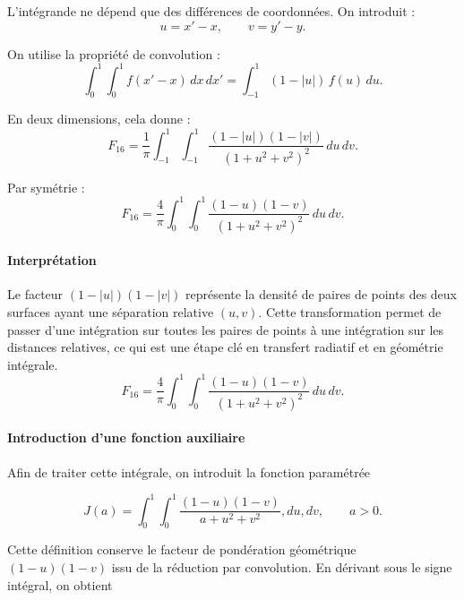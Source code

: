 L'intégrande ne dépend que des différences de coordonnées. On introduit :
\begin{equation}
u=x'-x, \qquad v=y'-y.
\end{equation}

On utilise la propriété de convolution :
\begin{equation}
\int_0^1\int_0^1 f(x'-x)\,dx\,dx'=\int_{-1}^{1}(1-|u|)\,f(u)\,du.
\end{equation}

En deux dimensions, cela donne :
\begin{equation}
F_{16}=\frac{1}{\pi}\int_{-1}^{1}\int_{-1}^{1}\frac{(1-|u|)(1-|v|)}{(1+u^2+v^2)^2}\,du\,dv.
\end{equation}

Par symétrie :
\begin{equation}
F_{16}=\frac{4}{\pi}\int_0^1\int_0^1\frac{(1-u)(1-v)}{(1+u^2+v^2)^2}\,du\,dv.
\end{equation}

\paragraph{Interprétation}

Le facteur $(1-|u|)(1-|v|)$ représente la densité de paires de points des deux surfaces ayant une séparation relative $(u,v)$. Cette transformation permet de passer d'une intégration sur toutes les paires de points à une intégration sur les distances relatives, ce qui est une étape clé en transfert radiatif et en géométrie intégrale.
\begin{equation}
F_{16}=\frac{4}{\pi}\int_0^1\int_0^1\frac{(1-u)(1-v)}{(1+u^2+v^2)^2}\,du\,dv.
\end{equation}

\paragraph{Introduction d'une fonction auxiliaire}

Afin de traiter cette intégrale, on introduit la fonction paramétrée

\begin{equation}
J(a)=\int_0^1\int_0^1\frac{(1-u)(1-v)}{a+u^2+v^2},du,dv,\qquad a>0.
\end{equation}

Cette définition conserve le facteur de pondération géométrique $(1-u)(1-v)$ issu de la réduction par convolution. En dérivant sous le signe intégral, on obtient

